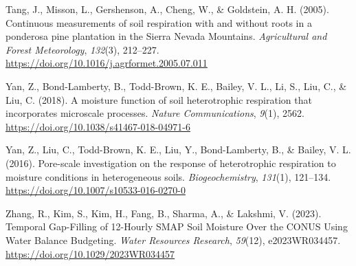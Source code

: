 \documentclass[
  letterpaper,
  DIV=11,
  numbers=noendperiod]{scrartcl}
\newlength{\cslhangindent}
\newenvironment{CSLReferences}[2] %
 {\begin{list}{}{%
  \setlength{\itemindent}{0pt}
  \setlength{\leftmargin}{0pt}
  \setlength{\parsep}{0pt}
  \ifodd #1
   \setlength{\leftmargin}{\cslhangindent}
   \setlength{\itemindent}{-1\cslhangindent}
  \fi
  \setlength{\itemsep}{#2\baselineskip}}}
 {\end{list}}
\begin{document}
\begin{CSLReferences}{1}{0}
Tang, J., Misson, L., Gershenson, A., Cheng, W., \& Goldstein, A. H.
(2005). Continuous measurements of soil respiration with and without
roots in a ponderosa pine plantation in the {Sierra Nevada Mountains}.
\emph{Agricultural and Forest Meteorology}, \emph{132}(3), 212--227.
\url{https://doi.org/10.1016/j.agrformet.2005.07.011}

Yan, Z., Bond-Lamberty, B., Todd-Brown, K. E., Bailey, V. L., Li, S.,
Liu, C., \& Liu, C. (2018). A moisture function of soil heterotrophic
respiration that incorporates microscale processes. \emph{Nature
Communications}, \emph{9}(1), 2562.
\url{https://doi.org/10.1038/s41467-018-04971-6}

Yan, Z., Liu, C., Todd-Brown, K. E., Liu, Y., Bond-Lamberty, B., \&
Bailey, V. L. (2016). Pore-scale investigation on the response of
heterotrophic respiration to moisture conditions in heterogeneous soils.
\emph{Biogeochemistry}, \emph{131}(1), 121--134.
\url{https://doi.org/10.1007/s10533-016-0270-0}

Zhang, R., Kim, S., Kim, H., Fang, B., Sharma, A., \& Lakshmi, V.
(2023). Temporal {Gap-Filling} of 12-{Hourly SMAP Soil Moisture Over}
the {CONUS Using Water Balance Budgeting}. \emph{Water Resources
Research}, \emph{59}(12), e2023WR034457.
\url{https://doi.org/10.1029/2023WR034457}

\end{CSLReferences}
\end{document}
